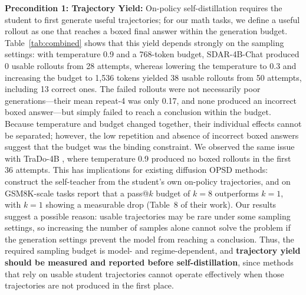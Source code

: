 \documentclass{article}
\begin{document}
\textbf{Precondition 1: Trajectory Yield:} On-policy self-distillation requires the student to first generate useful trajectories; for our math tasks, we define a useful rollout as one that reaches a boxed final answer within the generation budget. Table~\ref{tab:combined} shows that this yield depends strongly on the sampling settings: with temperature 0.9 and a 768-token budget, SDAR-4B-Chat produced 0 usable rollouts from 28 attempts, whereas lowering the temperature to 0.3 and increasing the budget to 1,536 tokens yielded 38 usable rollouts from 50 attempts, including 13 correct ones. The failed rollouts were not necessarily poor generations---their mean repeat-4 was only 0.17, and none produced an incorrect boxed answer---but simply failed to reach a conclusion within the budget. Because temperature and budget changed together, their individual effects cannot be separated; however, the low repetition and absence of incorrect boxed answers suggest that the budget was the binding constraint. We observed the same issue with TraDo-4B \citep{wang2025tracerl}, where temperature 0.9 produced no boxed rollouts in the first 36 attempts. This has implications for existing diffusion OPSD methods: \citet{dopsd2026} construct the self-teacher from the student's own on-policy trajectories, and on GSM8K-scale tasks report that a pass@$k$ budget of $k=8$ outperforms $k=1$, with $k=1$ showing a measurable drop (Table~8 of their work). Our results suggest a possible reason: usable trajectories may be rare under some sampling settings, so increasing the number of samples alone cannot solve the problem if the generation settings prevent the model from reaching a conclusion. Thus, the required sampling budget is model- and regime-dependent, and \textbf{trajectory yield should be measured and reported before self-distillation}, since methods that rely on usable student trajectories cannot operate effectively when those trajectories are not produced in the first place.
\end{document}
